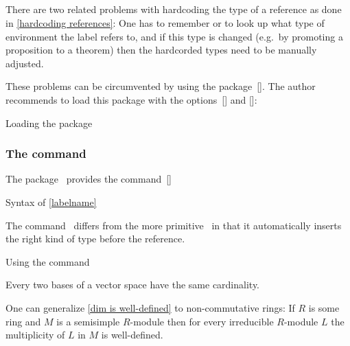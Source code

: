 \subsection{}

There are two related problems with hardcoding the type of a reference as done in \cref{hardcoding references}:
One has to remember or to look up what type of environment the label refers to, and if this type is changed (e.g.\ by promoting a proposition to a theorem) then the hardcorded types need to be manually adjusted.

These problems can be circumvented by using the package~[\packname].
The author recommends to load this package with the options~[\optname] and [\optname]:
\begin{showcode}[label={cref example}]{Loading the package~}
\usepackage[capitalise, noabbrev]{cleveref}
\end{showcode}

\subsubsection{The command~}

The package~ provides the command~[\comname]
\begin{showcode}{Syntax of }
\cref{labelname}
\end{showcode}
The command~ differs from the more primitive~ in that it automatically inserts the right kind of type before the reference.
\begin{showlatex}{Using the command~}
\begin{lemma}
  \label{dim is well-defined}
  Every two bases of a vector space have the same cardinality.
\end{lemma}

\begin{remark}
  One can generalize \cref{dim is well-defined} to non-commutative rings:
  If $R$ is some ring and $M$ is a semisimple $R$-module then for every irreducible $R$-module $L$ the multiplicity of $L$ in $M$ is well-defined.
\end{remark}
\end{showlatex}

